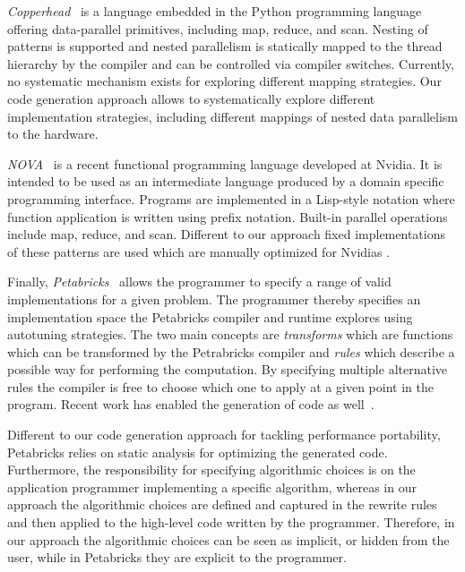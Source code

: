 \bigskip

\emph{Copperhead}~\cite{CatanzaroGK11} is a \GPU language embedded in the Python programming language offering data-parallel primitives, including map, reduce, and scan.
Nesting of patterns is supported and nested parallelism is statically mapped to the \GPU thread hierarchy by the compiler and can be controlled via compiler switches.
Currently, no systematic mechanism exists for exploring different mapping strategies.
Our code generation approach allows to systematically explore different implementation strategies, including different mappings of nested data parallelism to the hardware.

\bigskip

\emph{{\small NOVA}}~\cite{CollinsGGLS14} is a recent functional \GPU programming language developed at Nvidia.
It is intended to be used as an intermediate language produced by a domain specific programming interface.
Programs are implemented in a Lisp-style notation where function application is written using prefix notation.
Built-in parallel operations include map, reduce, and scan.
Different to our approach fixed implementations of these patterns are used which are manually optimized for Nvidias \GPUs.


\pagebreak

Finally, \emph{Petabricks}~\cite{AnselCWOZEA09} allows the programmer to specify a range of valid implementations for a given problem.
The programmer thereby specifies an implementation space the Petabricks compiler and runtime explores using autotuning strategies.
The two main concepts are \emph{transforms} which are functions which can be transformed by the Petrabricks compiler and \emph{rules} which describe a possible way for performing the computation.
By specifying multiple alternative rules the compiler is free to choose which one to apply at a given point in the program.
Recent work has enabled the generation of \GPU code as well~\cite{PhothilimthanaARA13}.

Different to our code generation approach for tackling performance portability, Petabricks relies on static analysis for optimizing the generated code.
Furthermore, the responsibility for specifying algorithmic choices is on the application programmer implementing a specific algorithm, whereas in our approach the algorithmic choices are defined and captured in the rewrite rules and then applied to the high-level code written by the programmer.
Therefore, in our approach the algorithmic choices can be seen as implicit, or hidden from the user, while in Petabricks they are explicit to the programmer.

